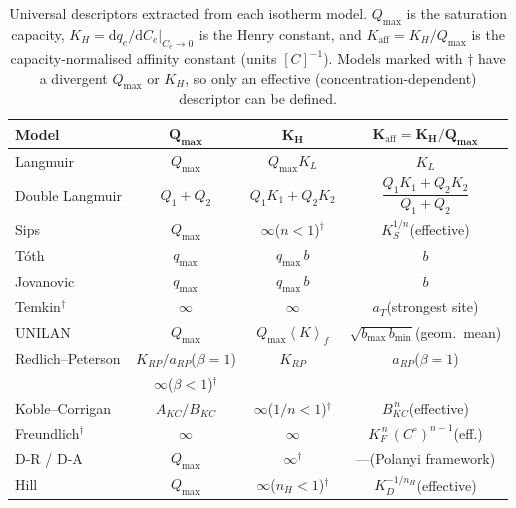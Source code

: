 \documentclass[12pt]{article}
\begin{document}
	\begin{table}[htbp]
		\centering
		\small
		\caption{Universal descriptors extracted from each isotherm
			model.  $Q_{\max}$ is the saturation capacity,
			$K_H = \mathrm{d}q_e/\mathrm{d}C_e|_{C_e\to 0}$ is the
			Henry constant, and
			$K_{\mathrm{aff}} = K_H / Q_{\max}$ is the
			capacity-normalised affinity constant (units $[C]^{-1}$).
			Models marked with $\dagger$ have a divergent $Q_{\max}$
			or $K_H$, so only an effective (concentration-dependent)
			descriptor can be defined.}
		\label{tab:universal_descriptors}
		\renewcommand{\arraystretch}{1.4}
		\begin{tabular}{lccc}
			\hline
			\textbf{Model}
			& $\boldsymbol{Q_{\max}}$
			& $\boldsymbol{K_H}$
			& $\boldsymbol{K_{\mathrm{aff}} = K_H/Q_{\max}}$
			\\
			\hline
			Langmuir
			& $Q_{\max}$
			& $Q_{\max} K_L$
			& $K_L$
			\\
			Double Langmuir
			& $Q_1 + Q_2$
			& $Q_1 K_1 + Q_2 K_2$
			& $\dfrac{Q_1 K_1 + Q_2 K_2}{Q_1 + Q_2}$
			\\[4pt]
			Sips
			& $Q_{\max}$
			& $\infty$\;($n<1$)$^{\dagger}$
			& $K_S^{1/n}$\;(effective)
			\\
			T\'oth
			& $q_{\max}$
			& $q_{\max}\,b$
			& $b$
			\\
			Jovanovic
			& $q_{\max}$
			& $q_{\max}\,b$
			& $b$
			\\
			Temkin$^{\dagger}$
			& $\infty$
			& $\infty$
			& $a_T$\;(strongest site)
			\\
			UNILAN
			& $Q_{\max}$
			& $Q_{\max}\!\left\langle K \right\rangle_{\!f}$
			& $\sqrt{b_{\max}\,b_{\min}}$\;(geom.\ mean)
			\\
			Redlich--Peterson
			& $K_{RP}/a_{RP}$\;($\beta\!=\!1$)
			& $K_{RP}$
			& $a_{RP}$\;($\beta\!=\!1$)
			\\
			& $\infty$\;($\beta\!<\!1$)$^{\dagger}$
			&
			&
			\\
			Koble--Corrigan
			& $A_{KC}/B_{KC}$
			& $\infty$\;($1/n<1$)$^{\dagger}$
			& $B_{KC}^{\,n}$\;(effective)
			\\
			Freundlich$^{\dagger}$
			& $\infty$
			& $\infty$
			& $K_F^{\,n}\,(C^\circ)^{n-1}$\;(eff.)
			\\
			D-R / D-A
			& $Q_{\max}$
			& $\infty^{\dagger}$
			& ---\;(Polanyi framework)
			\\
			Hill
			& $Q_{\max}$
			& $\infty$\;($n_H\!<\!1$)$^{\dagger}$
			& $K_D^{-1/n_H}$\;(effective)
			\\
			\hline
		\end{tabular}
	\end{table}
\end{document}
